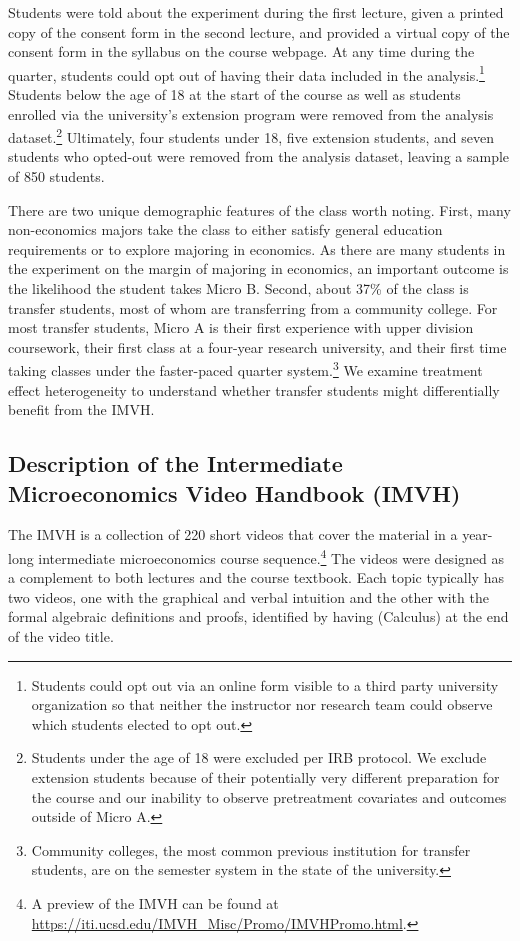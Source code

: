 \documentclass[12pt]{article}
\begin{document}
Students were told about the experiment during the first lecture, given a printed copy of the consent form in the second lecture, and provided a virtual copy of the consent form in the syllabus on the course webpage.
At any time during the quarter, students could opt out of having their data included in the analysis.\footnote{Students could opt out via an online form visible to a third party university organization so that neither the instructor nor research team could observe which students elected to opt out.} Students below the age of 18 at the start of the course as well as students enrolled via the university's extension program were removed from the analysis dataset.\footnote{Students under the age of 18 were excluded per IRB protocol. We exclude extension students because of their potentially very different preparation for the course and our inability to observe pretreatment covariates and outcomes outside of Micro A.} Ultimately, four students under 18, five extension students, and seven students who opted-out were removed from the analysis dataset, leaving a sample of 850 students.

There are two unique demographic features of the class worth noting.
First, many non-economics majors take the class to either satisfy general education requirements or to explore majoring in economics.
As there are many students in the experiment on the margin of majoring in economics, an important outcome is the likelihood the student takes Micro B. Second, about 37\% of the class is transfer students, most of whom are transferring from a community college.
For most transfer students, Micro A is their first experience with upper division coursework, their first class at a four-year research university, and their first time taking classes under the faster-paced quarter system.\footnote{Community colleges, the most common previous institution for transfer students, are on the semester system in the state of the university.} We examine treatment effect heterogeneity to understand whether transfer students might differentially benefit from the IMVH.

\subsection{Description of the Intermediate Microeconomics Video Handbook (IMVH)}\label{subsec:handbook_description}

The IMVH is a collection of 220 short videos that cover the material in a year-long intermediate microeconomics course sequence.\footnote{A preview of the IMVH can be found at \url{https://iti.ucsd.edu/IMVH_Misc/Promo/IMVHPromo.html}.} The videos were designed as a complement to both lectures and the course textbook.
Each topic typically has two videos, one with the graphical and verbal intuition and the other with the formal algebraic definitions and proofs, identified by having (Calculus) at the end of the video title.
\end{document}
